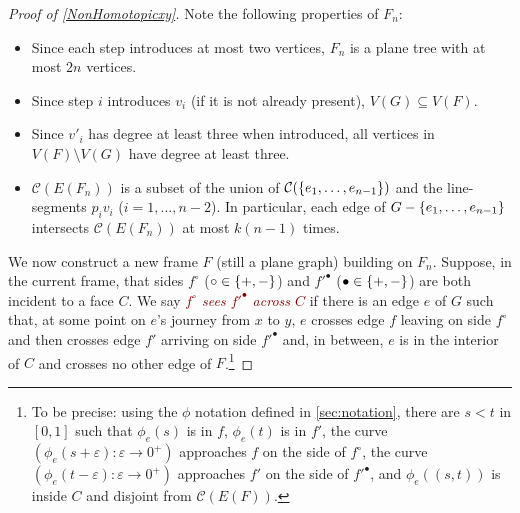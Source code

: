 \documentclass[a4paper,11pt]{article}
\DeclarePairedDelimiter{\set}{\lbrace}{\rbrace} %
\newcommand{\defn}[1]{\textcolor{Maroon}{\emph{#1}}}
\newcommand{\CC}{\mathcal{C}}
\newcommand{\eps}{\varepsilon}
\begin{document}
\begin{proof}[Proof of \cref{NonHomotopicxy}]
Note the following properties of $F_n$:
\begin{itemize}
    \item Since each step introduces at most two vertices, $F_n$ is a plane tree with at most $2n$ vertices.
    \item Since step $i$ introduces $v_i$ (if it is not already present), $V(G) \subseteq V(F)$.
    \item Since $v'_i$ has degree at least three when introduced, all vertices in $V(F) \setminus V(G)$ have degree at least three.
    \item $\CC(E(F_n))$ is a subset of the union of $\CC(\set{e_1, \dotsc, e_{n - 1}})$ and the line-segments $p_i v_i$ ($i = 1, \dotsc, n - 2$). In particular, each edge of $G - \set{e_1, \dotsc, e_{n - 1}}$ intersects $\CC(E(F_n))$ at most $k(n - 1)$ times.
\end{itemize}

We now construct a new frame $F$ (still a plane graph) building on $F_n$. Suppose, in the current frame, that sides $f^\circ$ ($\circ \in \set{+, -}$) and $f'^\bullet$ ($\bullet \in \set{+, -}$) are both incident to a face $C$. We say \defn{$f^\circ$ sees $f'^\bullet$ across $C$} if there is an edge $e$ of $G$ such that, at some point on $e$'s journey from $x$ to $y$, $e$ crosses edge $f$ leaving on side $f^\circ$ and then crosses edge $f'$ arriving on side $f'^\bullet$ and, in between, $e$ is in the interior of $C$ and crosses no other edge of $F$.\footnote{To be precise: using the $\phi$ notation defined in \cref{sec:notation}, there are $s < t$ in $[0, 1]$ such that $\phi_e(s)$ is in $f$, $\phi_e(t)$ is in $f'$, the curve $(\phi_e(s + \eps) \colon \eps \to 0^+)$ approaches $f$ on the side of $f^\circ$, the curve $(\phi_e(t - \eps) \colon \eps \to 0^+)$ approaches $f'$ on the side of $f'^\bullet$, and $\phi_e((s, t))$ is inside $C$ and disjoint from $\CC(E(F))$.}


\end{proof}
\end{document}
